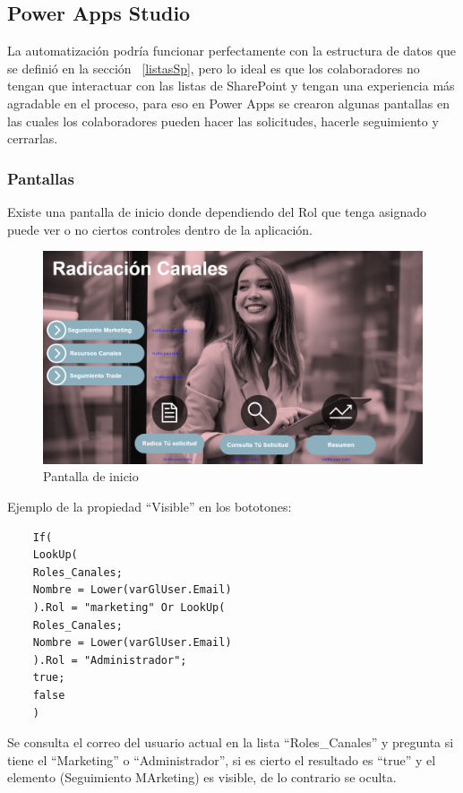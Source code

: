 \subsection{Power Apps Studio}
La automatización podría funcionar perfectamente con la estructura de datos que se definió en la sección ~\ref{listasSp}, pero lo ideal es que los colaboradores no tengan que interactuar con las listas de SharePoint y tengan una experiencia más agradable en el proceso, para eso en Power Apps se crearon algunas pantallas en las cuales los colaboradores pueden hacer las solicitudes, hacerle seguimiento y cerrarlas.

\subsubsection{Pantallas}
Existe una pantalla de inicio donde dependiendo del Rol que tenga asignado puede ver o no ciertos controles dentro de la aplicación.

\begin{figure}[H]
	\centering
	\includegraphics[scale=0.25]{Capitulo4/imagenes/18.png}
	\caption{Pantalla de inicio}
	\label{Pinicio}
\end{figure}

Ejemplo de la propiedad ``Visible'' en los bototones:

\begin{verbatim}
	If(
	LookUp(
	Roles_Canales;
	Nombre = Lower(varGlUser.Email)
	).Rol = "marketing" Or LookUp(
	Roles_Canales;
	Nombre = Lower(varGlUser.Email)
	).Rol = "Administrador";
	true;
	false
	)
\end{verbatim}

Se consulta el correo del usuario actual en la lista ``Roles\_Canales'' y pregunta si tiene el ``Marketing'' o ``Administrador'', si es cierto el resultado es ``true'' y el elemento (Seguimiento MArketing) es visible, de lo contrario se oculta.


